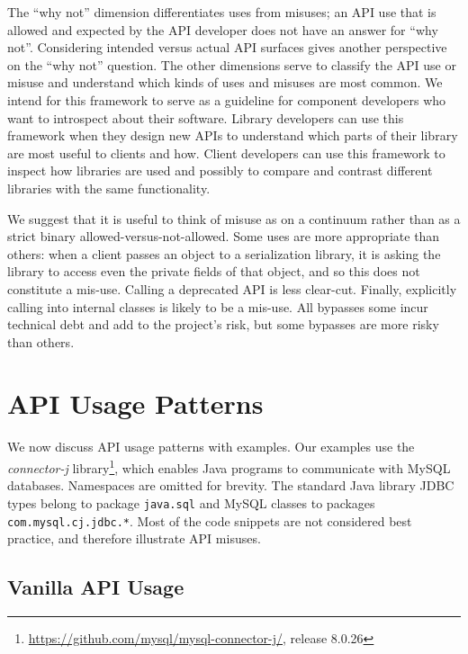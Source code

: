The ``why not'' dimension differentiates uses from misuses; an API use that is allowed and expected by the API developer does not have an answer for ``why not''. Considering intended versus actual API surfaces gives another
perspective on the ``why not'' question. The other dimensions serve to classify the API use or misuse and understand which kinds of uses and misuses are most common. We intend for this framework to serve as a guideline for component developers who want to introspect about their software. Library developers can use this framework when they design new APIs to understand which parts of their library are most useful to clients and how. Client developers can use this framework to inspect how libraries are used and possibly to compare and contrast different libraries with the same functionality.

We suggest that it is useful to think of misuse as on a
continuum rather than as a strict binary allowed-versus-not-allowed.
Some uses are more appropriate than others: when a
client passes an object to a serialization library, it is asking
the library to access even the private fields of that object, and so this
does not constitute a mis-use. Calling a deprecated API is less clear-cut.
Finally, explicitly calling into internal classes is likely to be a mis-use.
All bypasses some incur technical debt and add to the project's risk,
but some bypasses are more risky than others.


\section{API Usage Patterns}
\label{sec:patterns}

We now discuss API usage patterns with examples. Our examples use the \textit{connector-j} library\footnote{\url{https://github.com/mysql/mysql-connector-j/}, release 8.0.26}, which enables Java programs to communicate with MySQL databases. Namespaces are omitted for brevity. The standard Java library JDBC types belong to package \texttt{java.sql} and MySQL classes to packages \texttt{com.mysql.cj.jdbc.*}. Most of the code snippets are not considered best practice, and therefore illustrate API misuses.


\subsection{Vanilla API Usage}


